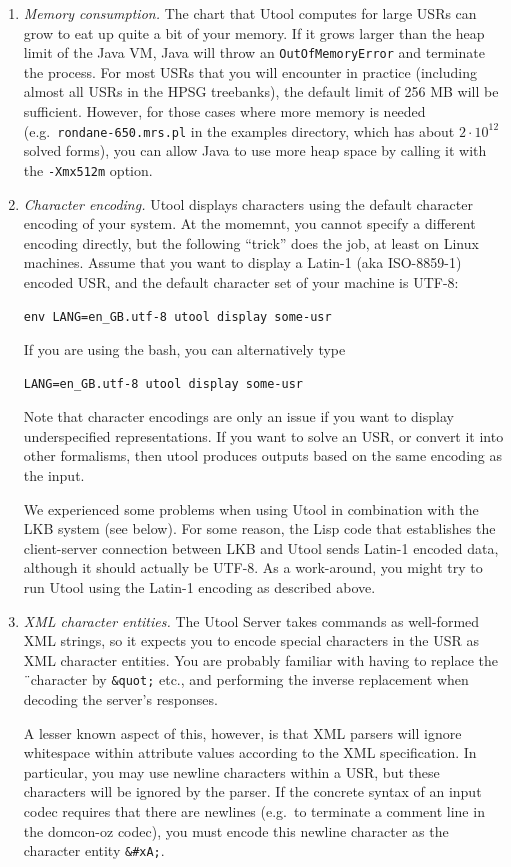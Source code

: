 \begin{enumerate}
\item \textit{Memory consumption.} The chart that Utool computes for
large USRs can grow to eat up quite a bit of your memory. If it grows
larger than the heap limit of the Java VM, Java will throw an
\verb?OutOfMemoryError? and terminate the process. For most USRs that
you will encounter in practice (including almost all USRs in the HPSG
treebanks), the default limit of 256 MB will be sufficient. However,
for those cases where more memory is needed (e.g.\
\verb?rondane-650.mrs.pl? in the examples directory, which has about
$2 \cdot 10^{12}$ solved forms), you can allow Java to use more heap
space by calling it with the \verb?-Xmx512m? option.

\item \textit{Character encoding.} Utool displays characters using the default
character encoding of your system. At the momemnt, you cannot specify a
different encoding directly, but the following ``trick'' does the job, at least
on Linux machines. Assume that you want to display a Latin-1 (aka ISO-8859-1)
encoded USR, and the default character set of your machine is UTF-8:

\begin{verbatim}
env LANG=en_GB.utf-8 utool display some-usr
\end{verbatim}
If you are using the bash, you can alternatively type
\begin{verbatim}
LANG=en_GB.utf-8 utool display some-usr
\end{verbatim}

Note that character encodings are only an issue if you want to display
underspecified representations. If you want to solve an USR, or convert it
into other formalisms, then utool produces outputs based on the same encoding as
the input.

We experienced some problems when using Utool in combination with the LKB system
(see below). For some reason, the Lisp code that establishes the client-server
connection between LKB and Utool sends Latin-1 encoded data, although it should
actually be UTF-8. As a work-around, you might try to run Utool using the
Latin-1 encoding as described above.


\item \textit{XML character entities.} The Utool Server takes commands
as well-formed XML strings, so it expects you to encode special
characters in the USR as XML character entities. You are probably
familiar with having to replace the \"\ character by \verb?&quot;?
etc., and performing the inverse replacement when decoding the
server's responses.

A lesser known aspect of this, however, is that XML parsers will
ignore whitespace within attribute values according to the XML
specification. In particular, you may use newline characters within a
USR, but these characters will be ignored by the parser. If the
concrete syntax of an input codec requires that there are newlines
(e.g.\ to terminate a comment line in the domcon-oz codec), you must
encode this newline character as the character entity \verb?&#xA;?.
\end{enumerate}




